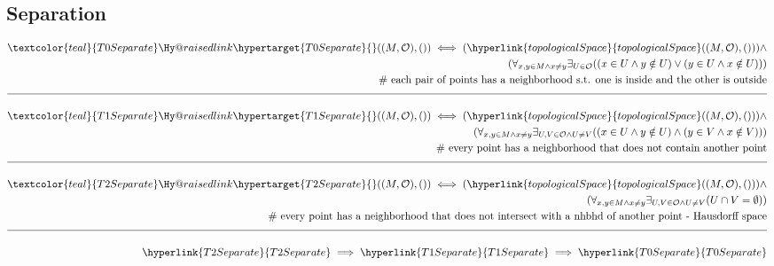 \documentclass[a4paper]{article}
\makeatletter
\def\ml{\mleft}
\def\mr{\mright}
\newcommand{\eqComment}[1]{\text{  \# #1}}
\newcommand{\n}{\\[1.5ex] \hline \nonumber \\[0ex]}
\newcommand{\m}{\nonumber \\}
\newcommand{\labeltarget}[1]{\Hy@raisedlink{\hypertarget{#1}{}}}
\newcommand{\dfn}[1]{\textcolor{teal}{#1}\labeltarget{#1}}
\newcommand{\rfr}[1]{\hyperlink{#1}{#1}}
\makeatother
\begin{document}
\subsection{Separation}
\begin{tcolorbox}
\begin{align}
   \dfn{T0Separate}\ml(\ml(M, \mathcal{O}\mr), \ml(\mr)\mr) \iff \ml(\rfr{topologicalSpace}\ml(\ml(M, \mathcal{O}\mr), \ml(\mr)\mr)\mr) \land
\m \ml(\forall_{x, y \in M \land x \neq y} \exists_{U \in \mathcal{O}} \ml(\ml(x \in U \land y \notin U\mr) \lor \ml(y \in U \land x \notin U\mr)\mr)\mr)
\m \eqComment{each pair of points has a neighborhood s.t. one is inside and the other is outside}
\n \dfn{T1Separate}\ml(\ml(M, \mathcal{O}\mr), \ml(\mr)\mr) \iff \ml(\rfr{topologicalSpace}\ml(\ml(M, \mathcal{O}\mr), \ml(\mr)\mr)\mr) \land
\m \ml(\forall_{x, y \in M \land x \neq y} \exists_{U, V \in \mathcal{O} \land U \neq V} \ml(\ml(x \in U \land y \notin U\mr) \land \ml(y \in V \land x \notin V\mr)\mr)\mr)
\m \eqComment{every point has a neighborhood that does not contain another point}
\n \dfn{T2Separate}\ml(\ml(M, \mathcal{O}\mr), \ml(\mr)\mr) \iff \ml(\rfr{topologicalSpace}\ml(\ml(M, \mathcal{O}\mr), \ml(\mr)\mr)\mr) \land
\m \ml(\forall_{x, y \in M \land x \neq y} \exists_{U, V \in \mathcal{O} \land U \neq V} \ml(U \cap V = \emptyset\mr)\mr)
\m \eqComment{every point has a neighborhood that does not intersect with a nhbhd of another point - Hausdorff space}
\n \rfr{T2Separate} \implies \rfr{T1Separate} \implies \rfr{T0Separate}
\end {align}
\end{tcolorbox}
\end{document}

